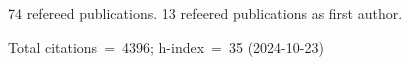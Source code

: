 74 refereed publications. 13 refeered publications as first author.

Total citations~=~4396; h-index~=~35 (2024-10-23)